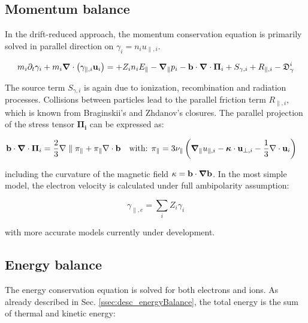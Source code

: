 \subsection{Momentum balance}

In the drift-reduced approach, the momentum  conservation equation is primarily solved in parallel direction on $\gamma_i = n_iu_{\parallel,i}$.

\begin{equation}
	m_i\partial_t \gamma_{i} + m_i\grad\cdot\left(\gamma_{\parallel,i}\mathbf{u}_i\right) = + Z_in_iE_\parallel -\grad_\parallel{p_i} - \mathbf{b}\cdot\grad\cdot\boldsymbol{\Pi}_i + S_{\gamma,i} + R_{\parallel,i} - \mathfrak{D}_\gamma^i
\end{equation}

The source term $S_{\gamma,i}$ is again due to ionization, recombination and radiation processes. Collisions between particles lead to the parallel friction term $R_{\parallel,i}$, which is known from Braginskii's and Zhdanov's closures. The parallel projection of the stress tensor $\mathbf{\Pi_i}$ can be expressed as\cite{braginskii1965transport,zeiler1997nonlinear, helander2005collisional}: 

\begin{align}
	\mathbf{b}\cdot\grad\cdot\boldsymbol{\Pi}_i = \frac{2}{3}\nabla\parallel\pi_\parallel + \pi_\parallel\nabla\cdot\mathbf{b} &&& \text{with: } \pi_\parallel = 3 \nu_\parallel \left( \grad_\parallel u_{\parallel,i} - \boldsymbol{\kappa}\cdot\mathbf{u}_{\perp,i} - \frac{1}{3}\nabla\cdot\mathbf{u}_i \right)
\end{align}

including the curvature of the magnetic field $\kappa = \mathbf{b}\cdot\grad\mathbf{b}$. In the most simple model, the electron velocity is calculated under full ambipolarity assumption:

\begin{equation}
	\label{eq:S3X_ambipolarity}
	\gamma_{\parallel,e} = \sum_iZ_i\gamma_i
\end{equation}

with more accurate models currently under development. 




\subsection{Energy balance}

The energy conservation equation is solved for both electrons and ions. As already described in Sec. \ref{ssec:desc_energyBalance}, the total energy is the sum of thermal and kinetic energy:

